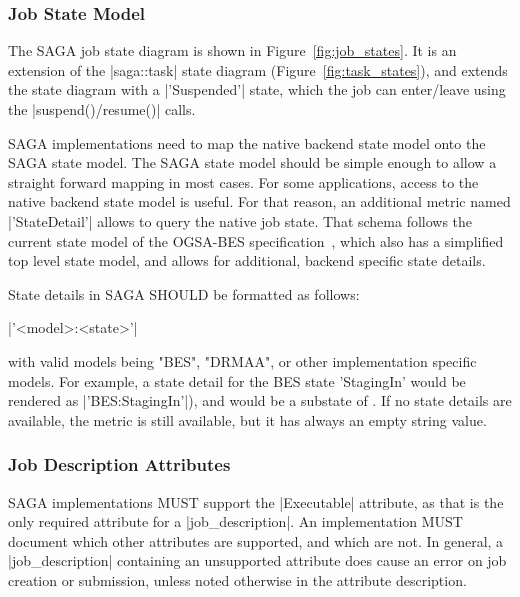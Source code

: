   \subsubsection{Job State Model}
  
    The SAGA job state diagram is shown in
    Figure~\ref{fig:job_states}.  It is an extension of the
    |saga::task| state diagram (Figure~\ref{fig:task_states}),
    and extends the state diagram  with a |'Suspended'| state, which the
    job can enter/leave using the |suspend()/resume()| calls.  
 
 
    SAGA implementations need to map the native backend state
    model onto the SAGA state model.  The SAGA state model
    should be simple enough to allow a straight forward mapping
    in most cases.  For some applications, access to the native
    backend state model is useful.  For that reason, an
    additional metric named |'StateDetail'| allows to query the
    native job state.  That schema follows the current state
    model of the OGSA-BES specification~\cite{bes}, which also
    has a simplified top level state model, and allows for
    additional, backend specific state details.
 
    State details in SAGA SHOULD be formatted as follows:
 
    \shift |'<model>:<state>'|
 
    with valid models being "BES", "DRMAA", or other
    implementation specific models.  For example, a state detail
    for the BES state 'StagingIn' would be rendered as
    |'BES:StagingIn'|), and would be a substate of
    .  If no state details are available, the metric
    is still available, but it has always an empty string value.
 
 
  \subsubsection{Job Description Attributes}
 
    SAGA implementations MUST support the |Executable|
    attribute, as that is the only required attribute for a
    |job_description|.  An implementation MUST document which
    other attributes are supported, and which are not.
    In general, a |job_description| containing an unsupported
    attribute does  cause an error on job creation or
    submission, unless noted otherwise in the attribute
    description.
    
